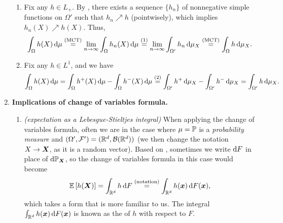 \begin{enumerate}
\begin{pf}
\begin{enumerate}[label={(\arabic*)}]
\item Fix any \(h\in L_{+}\). By , there exists a sequence
\(\{h_n\}\) of nonnegative simple functions on \(\Omega'\) such that
\(h_n\nearrow h\) (pointwisely), which implies \(h_n(X)\nearrow h(X)\). Thus,
\[
\int_{\Omega}^{}h(X)\odif{\mu}
\overset{\text{(MCT)}}{=}\lim_{n\to\infty}\int_{\Omega}^{}h_n(X)\odif{\mu}
\overset{(1)}{=}\lim_{n\to\infty}\int_{\Omega'}^{}h_n\odif{\mu_X}
\overset{\text{(MCT)}}{=}
\int_{\Omega}^{}h\odif{\mu_X}.
\]
\item Fix any \(h\in L^{1}\), and we have
\[
\int_{\Omega}^{}h(X)\odif{\mu}=
\int_{\Omega}^{}h^{+}(X)\odif{\mu}
-\int_{\Omega}^{}h^{-}(X)\odif{\mu}
\overset{(2)}{=}
\int_{\Omega'}^{}h^{+}\odif{\mu_X}
-\int_{\Omega'}^{}h^{-}\odif{\mu_X}
=\int_{\Omega'}^{}h\odif{\mu_X}.
\]
\end{enumerate}
\end{pf}
\item \textbf{Implications of change of variables formula.}
\begin{enumerate}
\item \emph{(expectation as a Lebesgue-Stieltjes integral)}
\label{it:lebesgue-stieljes-int} When applying the change of variables formula,
often we are in the case where \(\mu=\mathbb{P}\) is a \emph{probability measure} and
\((\Omega',\mathcal{F}')=(\mathbb{R}^{d},\mathcal{B}(\mathbb{R}^d))\) (we then change the
notation \(X\to\bm{X}\), as it is a random vector). Based on
, sometimes we write \(\odif{F}\) in place of
\(\odif{\pr_{\vect{X}}}\), so the change of variables formula in this case
would become
\[
\expv{h(\vect{X})}=\int_{\R^d}^{}h\odif{F}\overset{\text{(notation)}}{=}\int_{\R^d}^{}h(\vect{x})\odif{F(\vect{x})},
\]
which takes a form that is more familiar to us. The integral
\(\int_{\R^d}^{}h(\vect{x})\odif{F(\vect{x})}\) is known as the
 of \(h\) with respect to \(F\).


\end{enumerate}
\end{enumerate}
